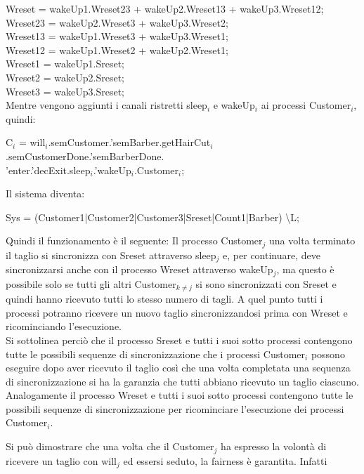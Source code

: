  \textsf{Wreset = wakeUp1.Wreset23 + wakeUp2.Wreset13 + wakeUp3.Wreset12;}\\
 \textsf{Wreset23 = wakeUp2.Wreset3 + wakeUp3.Wreset2;}\\
 \textsf{Wreset13 = wakeUp1.Wreset3 + wakeUp3.Wreset1;}\\
 \textsf{Wreset12 = wakeUp1.Wreset2 + wakeUp2.Wreset1;}\\
 \textsf{Wreset1 =  wakeUp1.Sreset;}\\
 \textsf{Wreset2 =  wakeUp2.Sreset;}\\
 \textsf{Wreset3 =  wakeUp3.Sreset;}\\

Mentre vengono aggiunti i canali ristretti \textsf{sleep$_{i}$} e \textsf{wakeUp$_{i}$} ai processi \textsf{Customer$_{i}$}, quindi:

\textsf{C$_{i}$ = will$_{i}$.semCustomer.'semBarber.getHairCut$_{i}$.semCustomerDone.'semBarberDone.\\'enter.'decExit.sleep$_{i}$.'wakeUp$_{i}$.Customer$_{i}$;}

Il sistema diventa:

\textsf{Sys = (Customer1|Customer2|Customer3|Sreset|Count1|Barber) \textbackslash L;}

Quindi il funzionamento è il seguente:
Il processo \textsf{Customer$_{j}$} una volta terminato il taglio si sincronizza con \textsf{Sreset} attraverso \textsf{sleep$_{j}$} e, per continuare, deve sincronizzarsi anche con il processo \textsf{Wreset} attraverso \textsf{wakeUp$_{j}$}, ma questo è possibile solo se tutti gli altri \textsf{Customer$_{k\not=j}$} si sono sincronizzati con \textsf{Sreset} e quindi hanno ricevuto tutti lo stesso numero di tagli. A quel punto tutti i processi potranno ricevere un nuovo taglio sincronizzandosi prima con \textsf{Wreset} e ricominciando l'esecuzione.\\
Si sottolinea perciò che il processo \textsf{Sreset} e tutti i suoi sotto processi contengono tutte le possibili sequenze di sincronizzazione che i processi \textsf{Customer$_{i}$} possono eseguire dopo aver ricevuto il taglio così che una volta completata una sequenza di sincronizzazione si ha la garanzia che tutti abbiano ricevuto un taglio ciascuno. Analogamente il processo \textsf{Wreset} e tutti i suoi sotto processi contengono tutte le possibili sequenze di sincronizzazione per ricominciare l'esecuzione dei processi \textsf{Customer$_{i}$}.

Si può dimostrare che una volta che il \textsf{Customer$_{j}$} ha espresso la volontà di ricevere un taglio con \textsf{will$_{j}$} ed essersi seduto, la fairness è garantita. Infatti

